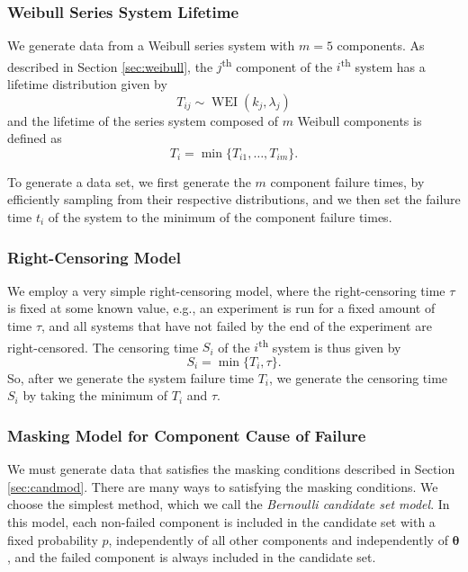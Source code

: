 \documentclass[
]{article}
\begin{document}
\hypertarget{weibull-series-system-lifetime}{%
\subsubsection*{Weibull Series System
Lifetime}\label{weibull-series-system-lifetime}}

We generate data from a Weibull series system with \(m=5\) components.
As described in Section \ref{sec:weibull}, the \(j\)\textsuperscript{th}
component of the \(i\)\textsuperscript{th} system has a lifetime
distribution given by \[
    T_{i j} \sim \operatorname{WEI}(k_j, \lambda_j)
\] and the lifetime of the series system composed of \(m\) Weibull
components is defined as \[
    T_i = \min\{T_{i 1}, \ldots, T_{i m}\}.
\]

To generate a data set, we first generate the \(m\) component failure
times, by efficiently sampling from their respective distributions, and
we then set the failure time \(t_i\) of the system to the minimum of the
component failure times.

\hypertarget{right-censoring-model}{%
\subsubsection*{Right-Censoring Model}\label{right-censoring-model}}

We employ a very simple right-censoring model, where the right-censoring
time \(\tau\) is fixed at some known value, e.g., an experiment is run
for a fixed amount of time \(\tau\), and all systems that have not
failed by the end of the experiment are right-censored. The censoring
time \(S_i\) of the \(i\)\textsuperscript{th} system is thus given by \[
    S_i = \min\{T_i, \tau\}.
\] So, after we generate the system failure time \(T_i\), we generate
the censoring time \(S_i\) by taking the minimum of \(T_i\) and
\(\tau\).

\hypertarget{masking-model-for-component-cause-of-failure}{%
\subsubsection*{Masking Model for Component Cause of
Failure}\label{masking-model-for-component-cause-of-failure}}

We must generate data that satisfies the masking conditions described in
Section \ref{sec:candmod}. There are many ways to satisfying the masking
conditions. We choose the simplest method, which we call the
\emph{Bernoulli candidate set model}. In this model, each non-failed
component is included in the candidate set with a fixed probability
\(p\), independently of all other components and independently of
\(\boldsymbol{\theta}\), and the failed component is always included in
the candidate set.
\end{document}
